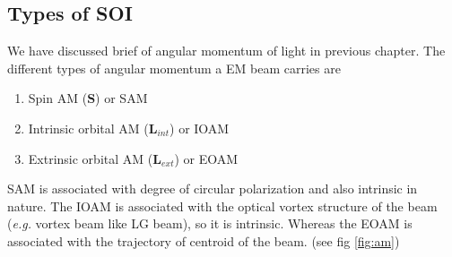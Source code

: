 \documentclass[11pt,a4paper]{article}
\numberwithin{equation}{section}
\begin{document}

\subsection{Types of SOI}
We have discussed brief of angular momentum of light in previous chapter. The different types of angular momentum a EM beam carries are
\begin{enumerate}
	\item Spin AM ($\boldsymbol{S}$) or SAM
	\item Intrinsic orbital AM ($\boldsymbol{L}_{int}$) or IOAM
	\item Extrinsic orbital AM ($\boldsymbol{L}_{ext}$) or EOAM
\end{enumerate}
SAM is associated with degree of circular polarization and also intrinsic in nature. The IOAM is associated with the optical vortex structure of the beam (\textit{e.g.} vortex beam like LG beam), so it is intrinsic. Whereas the EOAM is associated with the trajectory of centroid of the beam. \cite{bliokh 12} (see fig \ref{fig:am}) 
\end{document}
